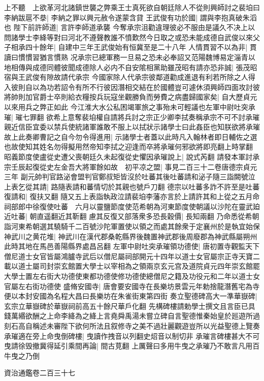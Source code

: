上不聽　上欲革河北諸鎮世襲之弊乘王士真死欲自朝廷除人不從則興師討之裴垍曰李納跋扈不㳟|{
	李納之罪以興元赦令遂蒙含貸}
王武俊有功於國|{
	謂與李抱真破朱滔也}
陛下前許師道|{
	言許李師道承襲}
今奪承宗沮勸違理彼必不服由是議久不决上以問諸學士李絳等對曰河北不遵聲教誰不憤歎然今日取之或恐未能成德自武俊以來父子相承四十餘年|{
	自建中三年王武俊始有恒冀至是二十八年}
人情貫習不以為非|{
	貫讀曰慣慣習猶言慣熟}
况承宗已總軍務一旦易之恐未必奉詔又范陽魏博易定淄青以地相傳與成德同體彼聞成德除人必内不自安隂相黨助雖茂昭有請亦恐非誠|{
	張茂昭宿與王武俊有隙故請代承宗}
今國家除人代承宗彼鄰道勸成進退有利若所除之人得入彼則自以為功若詔令有所不行彼因潛相交結在於國體豈可遽休須興師四面攻討彼將帥則加官爵士卒則給衣糧按兵玩寇坐觀勝負而勞費之病盡歸國家矣|{
	自大歷貞元以來用兵之弊正如此}
今江淮大水公私困竭軍旅之事殆未可輕議也左軍中尉吐突承璀|{
	璀七罪翻}
欲希上意奪裴垍權自請將兵討之宗正少卿李拭奏稱承宗不可不討承璀親近信臣宜委以禁兵使統諸軍誰敢不服上以拭狀示諸學士曰此姦臣也知朕欲將承璀故上此奏卿曹記之自今勿令得進用|{
	示諸學士者蓋以此時凡入翰林者即日輔佐之選也故使知其姓名勿得擬用然帝知李拭之迎逢而卒將承璀何邪欲將即亮翻上時掌翻}
昭義節度使盧從史遭父喪朝廷久未起復從史懼因承璀說上|{
	說式芮翻}
請發本軍討承宗壬辰起復從史左金吾大將軍餘如故　初平凉之盟|{
	事見二百三十二卷唐德宗貞元三年}
副元帥判官路泌會盟判官鄭叔矩皆沒於吐蕃其後吐蕃請和泌子隨三詣闕號泣上表乞從其請|{
	路隨表請和蕃情切於其親也號戶刀翻}
德宗以吐蕃多詐不許至是吐蕃復請和|{
	復扶又翻}
隨又五上表詣執政泣請裴垍李藩亦言於上請許其和上從之五月命祠部郎中徐復使吐蕃　六月以靈鹽節度使范希朝為河東節度使朝議以沙陀在靈武廹近吐蕃|{
	朝直遥翻近其靳翻}
慮其反復又部落衆多恐長穀價|{
	長知兩翻}
乃命悉從希朝詣河東希朝選其驍騎千二百號沙陀軍置使以領之而處其餘衆于定襄州於是執宜始保神武川之黄花堆|{
	神武川在漢代郡桑乾縣界後魏置神武郡後周廢郡為神武縣屬朔州此時其地在馬邑善陽縣界處昌呂翻}
左軍中尉吐突承璀領功德使|{
	唐初置寺觀監天下僧尼道士女官皆屬鴻臚寺武后以僧尼屬祠部開元十四年以道士女官屬宗正寺天寶二載以道士屬司封崇玄館置大學士以宰相為之領兩京玄元宫及道院貞元四年崇玄館罷大學士置左右街大功德使東都功德使修功德使總僧尼之籍及功役元和二年以道士女官屬左右街功德使}
盛脩安國寺|{
	唐會要安國寺在長樂坊景雲元年勅捨龍潛舊宅為寺便以本封安國為名程大昌曰長樂坊在朱雀街東第四街}
奏立聖德碑高大一準華嶽碑|{
	玄宗立華嶽碑於華嶽祠前高五十餘尺華戶化翻}
先構碑樓請勅學士撰文且言臣已具錢萬緡欲酬之上命李絳為之絳上言堯舜禹湯未嘗立碑自言聖德惟秦始皇於廵遊所過刻石高自稱述未審陛下欲何所法且叙修寺之美不過壯麗觀遊豈所以光益聖德上覽奏承璀適在旁上命曳倒碑樓|{
	曳讀作拽音以列翻史炤音以制切非}
承璀言碑樓甚大不可曳請徐毁撤冀得延引乘間再論|{
	間古莧翻}
上厲聲曰多用牛曳之承璀乃不敢言凡用百牛曳之乃倒

資治通鑑卷二百三十七
